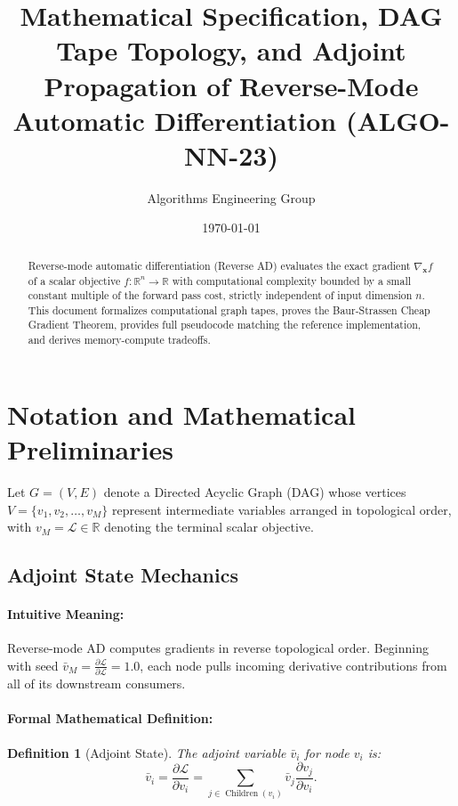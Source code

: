 \documentclass[11pt]{article}
\title{\textbf{Mathematical Specification, DAG Tape Topology, and Adjoint Propagation of Reverse-Mode Automatic Differentiation (ALGO-NN-23)}}
\author{Algorithms Engineering Group}
\date{\today}
\newtheorem{definition}{Definition}
\begin{document}
\maketitle

\begin{abstract}
Reverse-mode automatic differentiation (Reverse AD) evaluates the exact gradient $\nabla_\mathbf{x} f$ of a scalar objective $f: \mathbb{R}^n \to \mathbb{R}$ with computational complexity bounded by a small constant multiple of the forward pass cost, strictly independent of input dimension $n$. This document formalizes computational graph tapes, proves the Baur-Strassen Cheap Gradient Theorem, provides full pseudocode matching the reference implementation, and derives memory-compute tradeoffs.
\end{abstract}

\section{Notation and Mathematical Preliminaries}
\label{sec:notation}

Let $G = (V, E)$ denote a Directed Acyclic Graph (DAG) whose vertices $V = \{v_1, v_2, \dots, v_M\}$ represent intermediate variables arranged in topological order, with $v_M = \mathcal{L} \in \mathbb{R}$ denoting the terminal scalar objective.

\subsection{Adjoint State Mechanics}
\paragraph{Intuitive Meaning:} Reverse-mode AD computes gradients in reverse topological order. Beginning with seed $\bar{v}_M = \frac{\partial \mathcal{L}}{\partial \mathcal{L}} = 1.0$, each node pulls incoming derivative contributions from all of its downstream consumers.

\paragraph{Formal Mathematical Definition:}
\begin{definition}[Adjoint State]
The adjoint variable $\bar{v}_i$ for node $v_i$ is:
\begin{equation}
\label{eq:adjoint_def}
\bar{v}_i = \frac{\partial \mathcal{L}}{\partial v_i} = \sum_{j \in \operatorname{Children}(v_i)} \bar{v}_j \frac{\partial v_j}{\partial v_i}.
\end{equation}
\end{definition}
\end{document}
